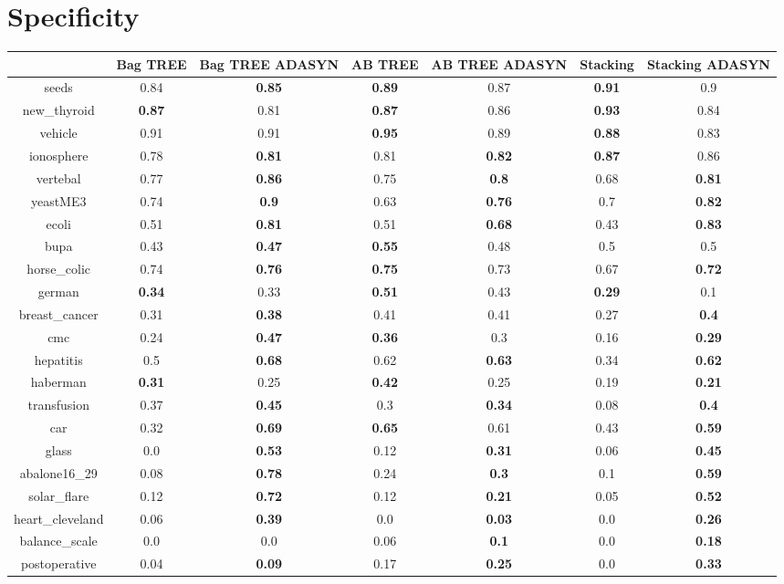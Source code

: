 \documentclass{article}%
\begin{document}
%
\section*{Specificity}%
\begin{tabular}{c|cccccc}%
&Bag TREE&Bag TREE ADASYN&AB TREE&AB TREE ADASYN&Stacking&Stacking ADASYN\\%
\hline%
seeds&0.84&\textbf{0.85}&\textbf{0.89}&0.87&\textbf{0.91}&0.9\\%
new\_thyroid&\textbf{0.87}&0.81&\textbf{0.87}&0.86&\textbf{0.93}&0.84\\%
vehicle&0.91&0.91&\textbf{0.95}&0.89&\textbf{0.88}&0.83\\%
ionosphere&0.78&\textbf{0.81}&0.81&\textbf{0.82}&\textbf{0.87}&0.86\\%
vertebal&0.77&\textbf{0.86}&0.75&\textbf{0.8}&0.68&\textbf{0.81}\\%
yeastME3&0.74&\textbf{0.9}&0.63&\textbf{0.76}&0.7&\textbf{0.82}\\%
ecoli&0.51&\textbf{0.81}&0.51&\textbf{0.68}&0.43&\textbf{0.83}\\%
bupa&0.43&\textbf{0.47}&\textbf{0.55}&0.48&0.5&0.5\\%
horse\_colic&0.74&\textbf{0.76}&\textbf{0.75}&0.73&0.67&\textbf{0.72}\\%
german&\textbf{0.34}&0.33&\textbf{0.51}&0.43&\textbf{0.29}&0.1\\%
breast\_cancer&0.31&\textbf{0.38}&0.41&0.41&0.27&\textbf{0.4}\\%
cmc&0.24&\textbf{0.47}&\textbf{0.36}&0.3&0.16&\textbf{0.29}\\%
hepatitis&0.5&\textbf{0.68}&0.62&\textbf{0.63}&0.34&\textbf{0.62}\\%
haberman&\textbf{0.31}&0.25&\textbf{0.42}&0.25&0.19&\textbf{0.21}\\%
transfusion&0.37&\textbf{0.45}&0.3&\textbf{0.34}&0.08&\textbf{0.4}\\%
car&0.32&\textbf{0.69}&\textbf{0.65}&0.61&0.43&\textbf{0.59}\\%
glass&0.0&\textbf{0.53}&0.12&\textbf{0.31}&0.06&\textbf{0.45}\\%
abalone16\_29&0.08&\textbf{0.78}&0.24&\textbf{0.3}&0.1&\textbf{0.59}\\%
solar\_flare&0.12&\textbf{0.72}&0.12&\textbf{0.21}&0.05&\textbf{0.52}\\%
heart\_cleveland&0.06&\textbf{0.39}&0.0&\textbf{0.03}&0.0&\textbf{0.26}\\%
balance\_scale&0.0&0.0&0.06&\textbf{0.1}&0.0&\textbf{0.18}\\%
postoperative&0.04&\textbf{0.09}&0.17&\textbf{0.25}&0.0&\textbf{0.33}\\%
\end{tabular}
\end{document}
